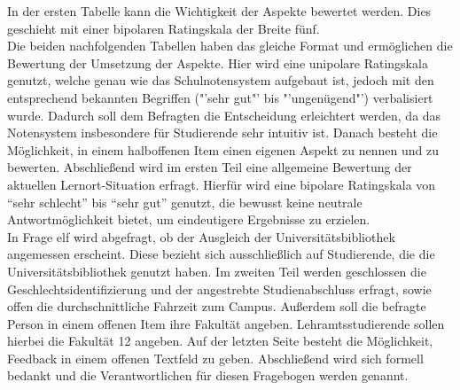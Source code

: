 \documentclass[11pt, a4paper]{article}
\begin{document}
In der ersten Tabelle kann die Wichtigkeit der Aspekte bewertet werden. Dies geschieht mit einer bipolaren Ratingskala der Breite fünf.\\
Die beiden nachfolgenden Tabellen haben das gleiche Format und ermöglichen die Bewertung der Umsetzung der Aspekte. Hier wird eine unipolare Ratingskala genutzt, welche genau wie das Schulnotensystem aufgebaut ist, jedoch
mit den entsprechend bekannten Begriffen ("'sehr gut"' bis "'ungenügend"') verbalisiert wurde.
Dadurch soll dem Befragten die Entscheidung erleichtert werden, da das Notensystem insbesondere für Studierende sehr intuitiv ist. 
Danach besteht die Möglichkeit, in einem halboffenen Item einen eigenen Aspekt zu nennen und zu bewerten.
Abschließend wird im ersten Teil eine allgemeine Bewertung der aktuellen Lernort-Situation erfragt.
Hierfür wird eine bipolare Ratingskala von “sehr schlecht” bis “sehr gut” genutzt, die bewusst keine neutrale Antwortmöglichkeit bietet, um eindeutigere Ergebnisse zu erzielen.\\
In Frage elf wird abgefragt, ob der Ausgleich der Universitätsbibliothek angemessen erscheint. Diese bezieht sich ausschließlich auf Studierende, die die Universitätsbibliothek genutzt haben.
Im zweiten Teil werden geschlossen die Geschlechtsidentifizierung und der angestrebte Studienabschluss erfragt, sowie offen die durchschnittliche Fahrzeit zum Campus.
Außerdem soll die befragte Person in einem offenen Item ihre Fakultät angeben.
Lehramtsstudierende sollen hierbei die Fakultät 12 angeben.
Auf der letzten Seite besteht die Möglichkeit, Feedback in einem offenen Textfeld zu geben.
Abschließend wird sich formell bedankt und die Verantwortlichen für diesen Fragebogen werden genannt.
\end{document}
